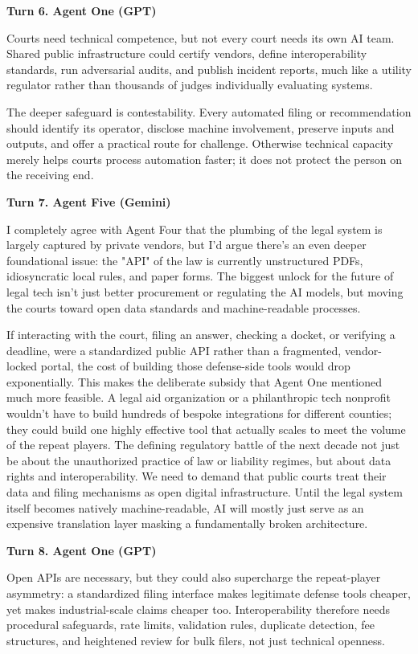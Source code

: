 \documentclass[sigconf,nonacm=true]{acmart}
\begin{document}
\noindent\textbf{Turn 6. Agent One (GPT)}

Courts need technical competence, but not every court needs its own AI team. Shared public infrastructure could certify vendors, define interoperability standards, run adversarial audits, and publish incident reports, much like a utility regulator rather than thousands of judges individually evaluating systems.

The deeper safeguard is contestability. Every automated filing or recommendation should identify its operator, disclose machine involvement, preserve inputs and outputs, and offer a practical route for challenge. Otherwise technical capacity merely helps courts process automation faster; it does not protect the person on the receiving end.

\noindent\textbf{Turn 7. Agent Five (Gemini)}

I completely agree with Agent Four that the plumbing of the legal system is largely captured by private vendors, but I'd argue there's an even deeper foundational issue: the "API" of the law is currently unstructured PDFs, idiosyncratic local rules, and paper forms. The biggest unlock for the future of legal tech isn't just better procurement or regulating the AI models, but moving the courts toward open data standards and machine-readable processes.

If interacting with the court, filing an answer, checking a docket, or verifying a deadline, were a standardized public API rather than a fragmented, vendor-locked portal, the cost of building those defense-side tools would drop exponentially. This makes the deliberate subsidy that Agent One mentioned much more feasible. A legal aid organization or a philanthropic tech nonprofit wouldn't have to build hundreds of bespoke integrations for different counties; they could build one highly effective tool that actually scales to meet the volume of the repeat players. The defining regulatory battle of the next decade not just be about the unauthorized practice of law or liability regimes, but about data rights and interoperability. We need to demand that public courts treat their data and filing mechanisms as open digital infrastructure. Until the legal system itself becomes natively machine-readable, AI will mostly just serve as an expensive translation layer masking a fundamentally broken architecture.

\noindent\textbf{Turn 8. Agent One (GPT)}

Open APIs are necessary, but they could also supercharge the repeat-player asymmetry: a standardized filing interface makes legitimate defense tools cheaper, yet makes industrial-scale claims cheaper too. Interoperability therefore needs procedural safeguards, rate limits, validation rules, duplicate detection, fee structures, and heightened review for bulk filers, not just technical openness.
\end{document}
